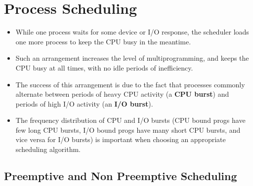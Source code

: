 \documentclass{article}
\theoremstyle{plain}
\theoremstyle{definition}
\begin{document}
\section{Process Scheduling}
\begin{itemize}
    \item While one process waits for some device or I/O response, the scheduler loads one more process to keep the CPU busy in the meantime. 
    
    \item Such an arrangement increases the level of multiprogramming, and keeps the CPU busy at all times, with no idle periods of inefficiency. 
    
    \item The success of this arrangement is due to the fact that processes commonly alternate between periods of heavy CPU activity (a \textbf{CPU burst}) and periods of high I/O activity (an \textbf{I/O burst}). 
    
    \item The frequency distribution of CPU and I/O bursts (CPU bound progs have few long CPU bursts, I/O bound progs have many short CPU bursts, and vice versa for I/O bursts) is important when choosing an appropriate scheduling algorithm.
\end{itemize}

\subsection{Preemptive and Non Preemptive Scheduling}
\end{document}
